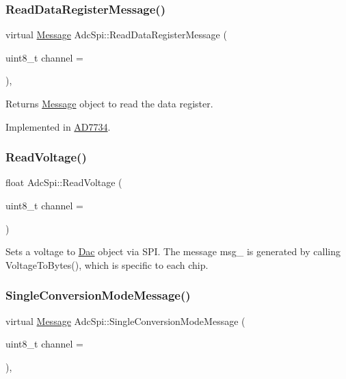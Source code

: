 \subsubsection{\texorpdfstring{Read\+Data\+Register\+Message()}{ReadDataRegisterMessage()}}
{\footnotesize\ttfamily virtual \mbox{\hyperlink{structAdcSpi_1_1Message}{Message}} Adc\+Spi\+::\+Read\+Data\+Register\+Message (\begin{DoxyParamCaption}\item[{uint8\+\_\+t}]{channel = {} }\end{DoxyParamCaption})\hspace{0.3cm}{\ttfamily [protected]}, {}}

Returns \mbox{\hyperlink{structAdcSpi_1_1Message}{Message}} object to read the data register. 

Implemented in \mbox{\hyperlink{classAD7734_a2bfd6161eedac320b5b77beb6f209517}{A\+D7734}}.

\mbox{\label{classAdcSpi_aa245df90e70654aabc64f88107ccd804}} 
\subsubsection{\texorpdfstring{Read\+Voltage()}{ReadVoltage()}}
{\footnotesize\ttfamily float Adc\+Spi\+::\+Read\+Voltage (\begin{DoxyParamCaption}\item[{uint8\+\_\+t}]{channel = {} }\end{DoxyParamCaption})}

Sets a voltage to \mbox{\hyperlink{classDac}{Dac}} object via S\+PI. The message msg\+\_\+ is generated by calling Voltage\+To\+Bytes(), which is specific to each chip. \mbox{\label{classAdcSpi_ac6a6421e3045c986c6997019a04d11ea}} 
\subsubsection{\texorpdfstring{Single\+Conversion\+Mode\+Message()}{SingleConversionModeMessage()}}
{\footnotesize\ttfamily virtual \mbox{\hyperlink{structAdcSpi_1_1Message}{Message}} Adc\+Spi\+::\+Single\+Conversion\+Mode\+Message (\begin{DoxyParamCaption}\item[{uint8\+\_\+t}]{channel = {} }\end{DoxyParamCaption})\hspace{0.3cm}{\ttfamily [protected]}, {}}

